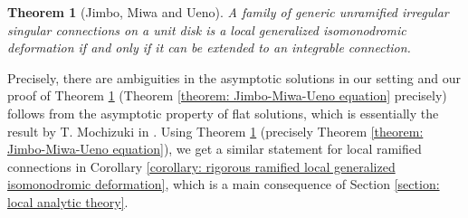 \documentclass[pdftex]{sigma}
\numberwithin{equation}{section}
\newtheorem{Theorem}{Theorem}[section]
\begin{document}
\begin{Theorem}[Jimbo, Miwa and Ueno] \label{theorem: 2}
A family of generic unramified irregular singular connections on a unit disk
is a local generalized isomonodromic deformation
if and only if it can be extended to an integrable connection.
\end{Theorem}

Precisely, there are ambiguities in the asymptotic solutions in our setting
and our proof of Theorem \ref{theorem: 2}
(Theorem \ref{theorem: Jimbo-Miwa-Ueno equation} precisely)
follows from the asymptotic property of flat solutions,
which is essentially the result by T. Mochizuki in \cite[Chapter 20]{Mochizuki}.
Using Theorem \ref{theorem: 2} (precisely Theorem \ref{theorem: Jimbo-Miwa-Ueno equation}),
we get a similar statement for local ramified connections
in Corollary \ref{corollary: rigorous ramified local generalized isomonodromic deformation},
which is a main consequence of Section \ref{section: local analytic theory}.
\end{document}
